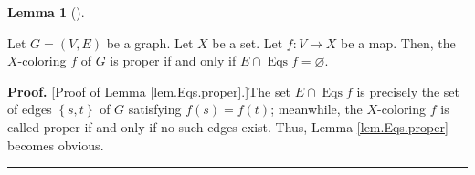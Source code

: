 \documentclass[numbers=enddot,12pt,final,onecolumn,notitlepage]{scrartcl}%
\theoremstyle{definition}
\newtheorem{lem}[theo]{Lemma}
\newenvironment{lemma}[1][]
{\begin{lem}[#1]\begin{leftbar}}
{\end{leftbar}\end{lem}}
\newenvironment{proof}[1][Proof]{\noindent\textbf{#1.} }{\ \rule{0.5em}{0.5em}}
\newenvironment{vershort}{}{}
\begin{document}
\begin{lemma}
\label{lem.Eqs.proper}Let $G=\left(  V,E\right)  $ be a graph. Let $X$ be a
set. Let $f:V\rightarrow X$ be a map. Then, the $X$-coloring $f$ of $G$ is
proper if and only if $E\cap\operatorname*{Eqs}f=\varnothing$.
\end{lemma}

\begin{vershort}
\begin{proof}
[Proof of Lemma \ref{lem.Eqs.proper}.]The set $E\cap\operatorname*{Eqs}f$ is
precisely the set of edges $\left\{  s,t\right\}  $ of $G$ satisfying
$f\left(  s\right)  =f\left(  t\right)  $; meanwhile, the $X$-coloring $f$ is
called proper if and only if no such edges exist. Thus, Lemma
\ref{lem.Eqs.proper} becomes obvious.
\end{proof}
\end{vershort}
\end{document}
